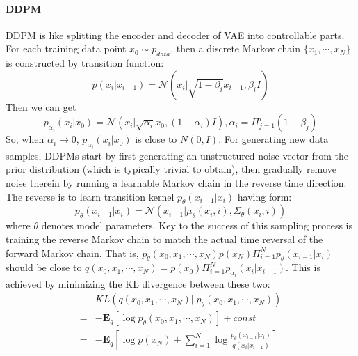 \paragraph{DDPM}
DDPM is like splitting the encoder and decoder of VAE into controllable parts. 
For each training data point $x_0\sim p_{data}$, then a discrete Markov chain $\{x_1, \cdots, x_N\}$ is constructed by transition function:
\begin{equation}
    p(x_i|x_{i-1})=\mathcal{N}(x_i|\sqrt{1-\beta_i}x_{i-1}, \beta_i I)
\end{equation}
Then we can get 
\begin{equation}
    p_{\alpha_i}(x_i|x_0) = \mathcal{N}(x_i|\sqrt{\alpha_i}x_0, (1-\alpha_i)I), \alpha_i = \Pi_{j=1}^i(1-\beta_j)
\end{equation}
So, when $\alpha_i\to 0$, $p_{\alpha_i}(x_i|x_0)$ is close to $N(0, I)$. For generating  new data samples, DDPMs start by first generating an unstructured noise vector from the prior distribution (which is  typically trivial to obtain), then gradually remove noise therein by running a learnable Markov chain in the reverse  time direction.
The reverse is to learn transition kernel $p_\theta(x_{i-1}|x_i)$ having form:
\begin{equation}
    p_\theta(x_{i-1}|x_i) = \mathcal{N}(x_{i-1}|\mu_\theta(x_i, i), \Sigma_\theta(x_i, i))
\end{equation}
where $\theta$ denotes model parameters. Key to the success of this sampling process is training the reverse Markov chain to match the actual time reversal  of the forward Markov chain.
That is, $p_\theta(x_0, x_1, \cdots, x_N)p(x_N)\Pi_{i=1}^Np_\theta(x_{i-1}|x_i)$ should be close to $q(x_0, x_1, \cdots, x_N)=p(x_0)\Pi_{i=1}^Np_{\alpha_i}(x_i|x_{i-1})$.
This is achieved by minimizing the KL divergence between these two:
\begin{equation}
    \begin{aligned}
        &KL(q(x_0, x_1, \cdots, x_N)||p_\theta(x_0, x_1, \cdots, x_N))\\
        =&-\mathbf{E}_{q}\left[\log p_\theta(x_0, x_1, \cdots, x_N)\right] + const\\
        =&-\mathbf{E}_{q}\left[\log p(x_N) + \sum_{i=1}^N \log \frac{p_\theta(x_{i-1}|x_i)}{q(x_i|x_{i-1})}\right]
    \end{aligned}
\end{equation}


